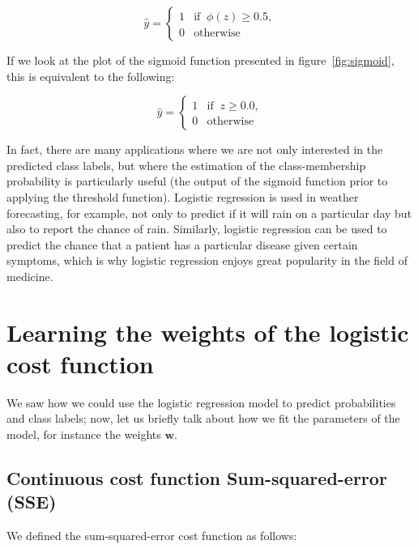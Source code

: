 \documentclass[11pt]{article}
\newcommand{\vect}[1]{\boldsymbol{#1}}
\begin{document}
    \begin{equation}
        \label{eq:lr_func_thres}
        \hat{y} =
        \begin{cases}
            1 & {\text{if }}\ \phi(z) \geq 0.5, \\
            0 & {\text{otherwise}}
        \end{cases}
    \end{equation}


    If we look at the plot of the sigmoid function presented in figure~\ref{fig:sigmoid}, this is equivalent to the following:

    \begin{equation}
        \hat{y} =
        \begin{cases}
            1 & {\text{if }}\ z \geq 0.0, \\
            0 & {\text{otherwise}}
        \end{cases}
    \end{equation}

    In fact, there are many applications where we are not only interested in the predicted class labels, but where the estimation of the class-membership probability is particularly useful (the output of the sigmoid function prior to applying the threshold function).
    Logistic regression is used in weather forecasting, for example, not only to predict if it will rain on a particular day but also to report the chance of rain.
    Similarly, logistic regression can be used to predict the chance that a patient has a particular disease given certain symptoms, which is why logistic regression enjoys great popularity in the field of medicine.

    \section{Learning the weights of the logistic cost function} \label{sec:lr_weights}

    We saw how we could use the logistic regression model to predict probabilities and class labels;
    now, let us briefly talk about how we fit the parameters of the model, for instance the weights $\vect{w}$.

    \subsection{Continuous cost function Sum-squared-error (SSE)} \label{subsec:sse}

    We defined the sum-squared-error cost function as follows:
\end{document}

